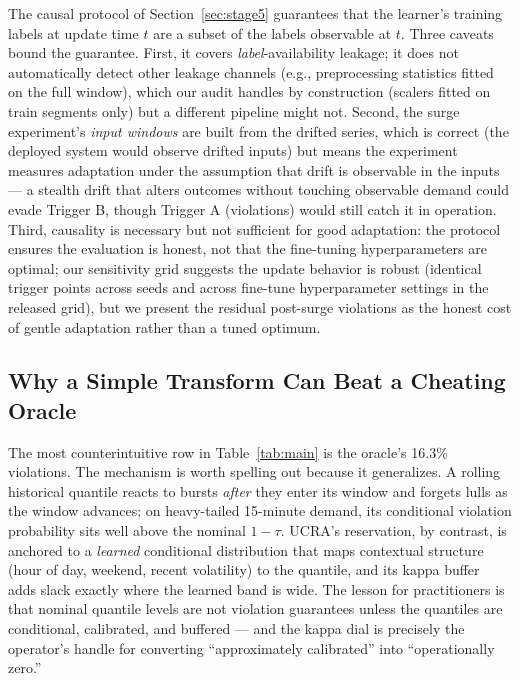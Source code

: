 The causal protocol of Section~\ref{sec:stage5} guarantees that the
learner's training labels at update time $t$ are a subset of the
labels observable at $t$. Three caveats bound the guarantee. First,
it covers \emph{label}-availability leakage; it does not
automatically detect other leakage channels (e.g., preprocessing
statistics fitted on the full window), which our audit handles by
construction (scalers fitted on train segments only) but a different
pipeline might not. Second, the surge experiment's \emph{input
windows} are built from the drifted series, which is correct (the
deployed system would observe drifted inputs) but means the
experiment measures adaptation under the assumption that drift is
observable in the inputs --- a stealth drift that alters outcomes
without touching observable demand could evade Trigger B, though
Trigger A (violations) would still catch it in operation. Third,
causality is necessary but not sufficient for good adaptation: the
protocol ensures the evaluation is honest, not that the fine-tuning
hyperparameters are optimal; our sensitivity grid suggests the
update behavior is robust (identical trigger points across seeds and
across fine-tune hyperparameter settings in the released grid), but
we present the residual post-surge violations as the honest cost of
gentle adaptation rather than a tuned optimum.

\subsection{Why a Simple Transform Can Beat a Cheating Oracle}

The most counterintuitive row in Table~\ref{tab:main} is the oracle's
16.3\% violations. The mechanism is worth spelling out because it
generalizes. A rolling historical quantile reacts to bursts
\emph{after} they enter its window and forgets lulls as the window
advances; on heavy-tailed 15-minute demand, its conditional violation
probability sits well above the nominal $1 - \tau$. UCRA's
reservation, by contrast, is anchored to a \emph{learned} conditional
distribution that maps contextual structure (hour of day, weekend,
recent volatility) to the quantile, and its kappa buffer adds slack
exactly where the learned band is wide. The lesson for practitioners
is that nominal quantile levels are not violation guarantees unless
the quantiles are conditional, calibrated, and buffered --- and the
kappa dial is precisely the operator's handle for converting
``approximately calibrated'' into ``operationally zero.''

